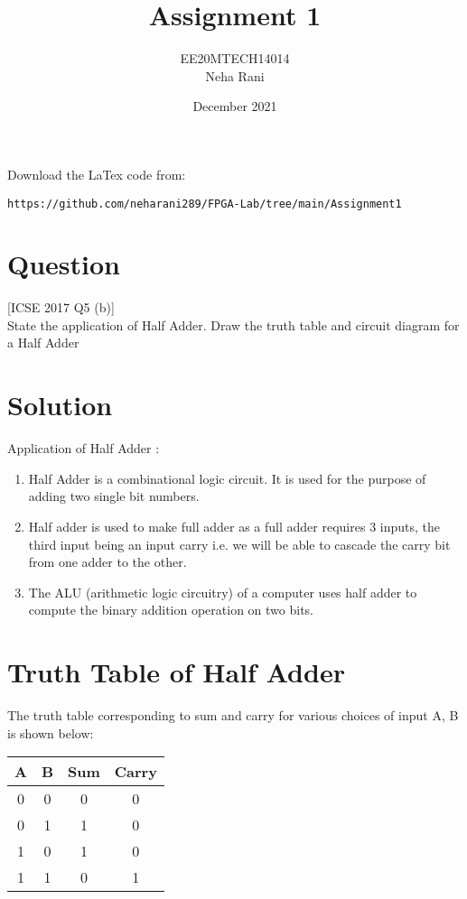 \documentclass[journal,12pt,twocolumn]{IEEEtran}
\title{Assignment 1}
\author{EE20MTECH14014\\Neha Rani}
\date{December 2021}
\numberwithin{equation}{section}
\begin{document}
\maketitle
Download the LaTex code from:
\begin{lstlisting}
https://github.com/neharani289/FPGA-Lab/tree/main/Assignment1
\end{lstlisting}

\section{Question}

[ICSE 2017 Q5 (b)]\\
State the application of Half Adder. Draw the truth table and circuit diagram for a Half Adder

\section{Solution}
Application of Half Adder :\\
\begin{enumerate}
    \item Half Adder is a combinational logic circuit.
It is used for the purpose of adding two single bit numbers.\\
\item Half adder is used to make full adder as a full adder requires 3 inputs, the third input being an input carry i.e. we will be able to cascade the carry bit from one adder to the other.\\
\item The ALU (arithmetic logic circuitry) of a computer uses half adder to compute the binary addition operation on two bits.\\
\end{enumerate}

\section{Truth Table of Half Adder}
\space
The truth table corresponding to sum and carry for various choices of input A, B is shown below:\\
\medskip

    \centering
          \begin{tabular}{|c|c|c|c|}
            \hline
            A & B & Sum & Carry \\
            \hline
            0 & 0 & 0 & 0\\
            \hline
             0 & 1 & 1 & 0\\
            \hline
             1 & 0 & 1 & 0\\
            \hline
             1 & 1 & 0 & 1\\
            \hline
        \end{tabular}
        \\
        \space
\end{document}
